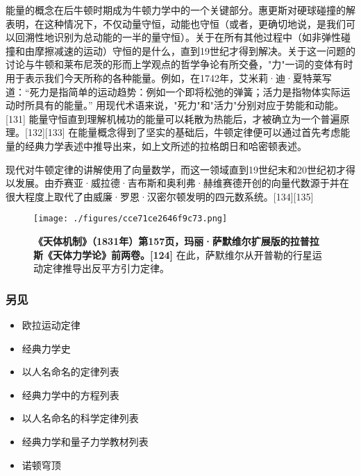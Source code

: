 能量的概念在后牛顿时期成为牛顿力学中的一个关键部分。惠更斯对硬球碰撞的解表明，在这种情况下，不仅动量守恒，动能也守恒（或者，更确切地说，是我们可以回溯性地识别为总动能的一半的量守恒）。关于在所有其他过程中（如非弹性碰撞和由摩擦减速的运动）守恒的是什么，直到19世纪才得到解决。关于这一问题的讨论与牛顿和莱布尼茨的形而上学观点的哲学争论有所交叠，"力"一词的变体有时用于表示我们今天所称的各种能量。例如，在1742年，艾米莉·迪·夏特莱写道：“死力是指简单的运动趋势：例如一个即将松弛的弹簧；活力是指物体实际运动时所具有的能量。” 用现代术语来说，"死力"和"活力"分别对应于势能和动能。[131] 能量守恒直到理解机械功的能量可以耗散为热能后，才被确立为一个普遍原理。[132][133] 在能量概念得到了坚实的基础后，牛顿定律便可以通过首先考虑能量的经典力学表述中推导出来，如上文所述的拉格朗日和哈密顿表述。

现代对牛顿定律的讲解使用了向量数学，而这一领域直到19世纪末和20世纪初才得以发展。由乔赛亚·威拉德·吉布斯和奥利弗·赫维赛德开创的向量代数源于并在很大程度上取代了由威廉·罗恩·汉密尔顿发明的四元数系统。[134][135]
\begin{figure}[ht]
\centering
\texttt{[image: ./figures/cce71ce2646f9c73.png]}
\caption{\textbf{《天体机制》（1831年）第157页，玛丽·萨默维尔扩展版的拉普拉斯《天体力学论》前两卷。[124]} 在此，萨默维尔从开普勒的行星运动定律推导出反平方引力定律。} \label{fig_NEW01_23}
\end{figure}
\subsubsection{另见}
\begin{itemize}
\item 欧拉运动定律  
\item 经典力学史  
\item 以人名命名的定律列表  
\item 经典力学中的方程列表  
\item 以人名命名的科学定律列表  
\item 经典力学和量子力学教材列表  
\item 诺顿穹顶
\end{itemize}
